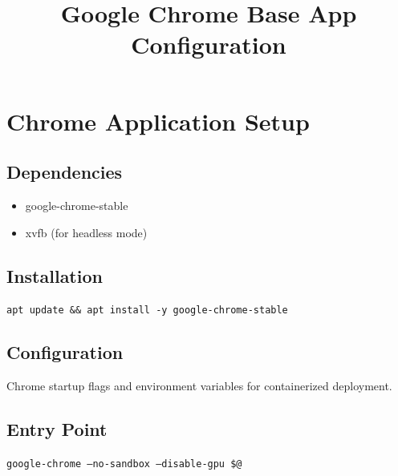 \documentclass{article}
\title{Google Chrome Base App Configuration}
\author{}
\date{}
\begin{document}
\section*{Chrome Application Setup}

\subsection*{Dependencies}
\begin{itemize}
    \item google-chrome-stable
    \item xvfb (for headless mode)
\end{itemize}

\subsection*{Installation}
\texttt{apt update \&\& apt install -y google-chrome-stable}

\subsection*{Configuration}
Chrome startup flags and environment variables for containerized deployment.

\subsection*{Entry Point}
\texttt{google-chrome --no-sandbox --disable-gpu \$@}
\end{document}
